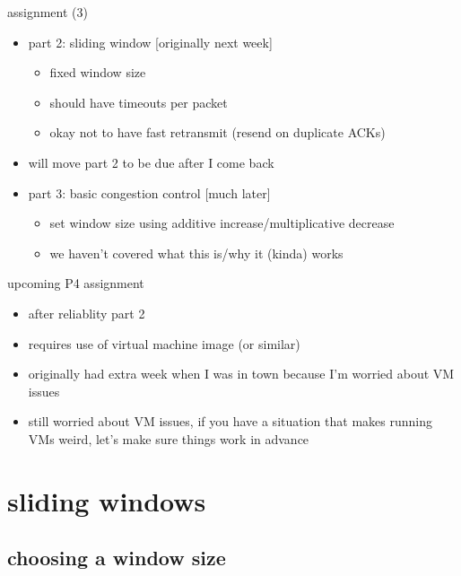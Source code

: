 \begin{frame}{assignment (3)}
    \begin{itemize}
    \item part 2: sliding window [originally next week]
        \begin{itemize}
        \item fixed window size
        \item should have timeouts per packet
        \item okay not to have fast retransmit (resend on duplicate ACKs)
        \end{itemize}
    \item will move part 2 to be due after I come back
    \item part 3: basic congestion control [much later]
        \begin{itemize}
        \item set window size using additive increase/multiplicative decrease
        \item we haven't covered what this is/why it (kinda) works
        \end{itemize}
    \end{itemize}
\end{frame}

\begin{frame}{upcoming P4 assignment}
    \begin{itemize}
    \item after reliablity part 2
    \item requires use of virtual machine image (or similar)
    \item originally had extra week when I was in town because I'm worried about VM issues
    \vspace{.5cm}
    \item still worried about VM issues, if you have a situation that makes running VMs weird,
        let's make sure things work in advance
    \end{itemize}
\end{frame}

\section{sliding windows}
\subsection{choosing a window size}


